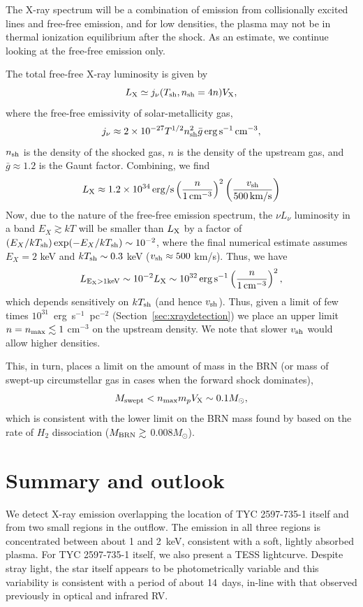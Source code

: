 \documentclass[linenumbers]{aastex631}
\newcommand{\be}{\begin{equation}}
\newcommand{\ee}{\end{equation}}
\begin{document}
The X-ray spectrum will be a combination of emission from collisionally excited lines and free-free emission, and for low densities, the plasma may not be in thermal ionization equilibrium after the shock. As an estimate, we continue looking at the free-free emission only.

The total free-free X-ray luminosity is given by
\be
L_{\rm X} \simeq j_{\nu}(T_{\rm sh},n_{\rm sh} = 4 n)V_{\rm X},
\ee
where the free-free emissivity of solar-metallicity gas,
\be
j_{\nu} \approx 2\times 10^{-27}T^{1/2}n_{\rm sh}^{2}\bar{g}\,{\rm erg\,s^{-1}\,cm^{-3}},
\ee
$n_{\rm sh}$ is the density of the shocked gas, $n$ is the density of the upstream gas, and $\bar{g} \approx 1.2$ is the Gaunt factor.  Combining, we find
\be
L_{\rm X} \approx 1.2\times 10^{34}\,{\rm erg/s}\left(\frac{n}{1\,{\rm cm^{-3}}}\right)^{2}\left(\frac{v_{\rm sh}}{500\,{\rm km/s}}\right)
\ee
Now, due to the nature of the free-free emission spectrum, the $\nu L_{\nu}$ luminosity in a band $E_X \gtrsim kT$ will be smaller than $L_{\rm X}$ by a factor of $(E_X/kT_{\rm sh})\exp(-E_X/kT_{\rm sh}) \sim 10^{-2}$, where the final numerical estimate assumes $E_X = 2$ keV and $kT_{\rm sh} \sim 0.3$ keV ($v_{\rm sh} \approx 500$ km/s).  Thus, we have
\be
L_{\rm E_X > 1 keV} \sim 10^{-2}L_{\rm X} \sim 10^{32}\,{\rm erg\,s^{-1}}\left(\frac{n}{1\,{\rm cm^{-3}}}\right)^{2},
\ee
which depends sensitively on $kT_{\rm sh}$ (and hence $v_{\rm sh}$).  Thus, given a limit
of few times $10^{31}$~erg~s$^{-1}$~pc$^{-2}$ (Section~\ref{sec:xraydetection})
we place an upper limit $n = n_{\rm max} \lesssim 1$ cm$^{-3}$ on the upstream density. We note that slower $v_{\rm sh}$ would allow higher densities.

This, in turn, places a limit on the amount of mass in the BRN (or mass of swept-up circumstellar gas in cases when the forward shock dominates),
\be
M_{\rm swept} < n_{\rm max} m_p V_{\rm X} \sim 0.1M_{\odot},
\ee
which is consistent with the lower limit on the BRN mass found by \citet{2020Natur.587..387H} based on the rate of $H_2$ dissociation ($M_{\rm BRN} \gtrsim$ 0.008$M_{\odot}$).


\section{Summary and outlook}
\label{sec:summary}
We detect X-ray emission overlapping the location of TYC 2597-735-1 itself and from two small regions in the outflow. The emission in all three regions is concentrated between about 1 and 2~keV, consistent with a soft, lightly absorbed plasma.  For TYC 2597-735-1 itself, we also present a TESS lightcurve. Despite stray light, the star itself appears to be photometrically variable and this variability is consistent with a period of about 14~days, in-line with that observed previously in optical and infrared RV.
\end{document}
